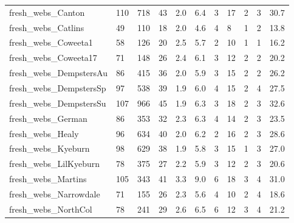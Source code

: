 \begin{longtable}{lllllllllll}
 fresh\_webs\_Canton                                  & 110        & 718       & 43    & 2.0    & 6.4    & 3     & 17     & 2      & 3      & 30.7    \\
 fresh\_webs\_Catlins                                 & 49         & 110       & 18    & 2.0    & 4.6    & 4     & 8      & 1      & 2      & 13.8    \\
 fresh\_webs\_Coweeta1                                & 58         & 126       & 20    & 2.5    & 5.7    & 2     & 10     & 1      & 1      & 16.2    \\
 fresh\_webs\_Coweeta17                               & 71         & 148       & 26    & 2.4    & 6.1    & 3     & 12     & 2      & 2      & 20.2    \\
 fresh\_webs\_DempstersAu                             & 86         & 415       & 36    & 2.0    & 5.9    & 3     & 15     & 2      & 2      & 26.2    \\
 fresh\_webs\_DempstersSp                             & 97         & 538       & 39    & 1.9    & 6.0    & 4     & 15     & 2      & 4      & 27.5    \\
 fresh\_webs\_DempstersSu                             & 107        & 966       & 45    & 1.9    & 6.3    & 3     & 18     & 2      & 3      & 32.6    \\
 fresh\_webs\_German                                  & 86         & 353       & 32    & 2.3    & 6.3    & 4     & 14     & 2      & 3      & 23.5    \\
 fresh\_webs\_Healy                                   & 96         & 634       & 40    & 2.0    & 6.2    & 2     & 16     & 2      & 3      & 28.6    \\
 fresh\_webs\_Kyeburn                                 & 98         & 629       & 38    & 1.9    & 5.8    & 3     & 15     & 1      & 3      & 27.0    \\
 fresh\_webs\_LilKyeburn                              & 78         & 375       & 27    & 2.2    & 5.9    & 3     & 12     & 2      & 3      & 20.6    \\
 fresh\_webs\_Martins                                 & 105        & 343       & 41    & 3.3    & 9.0    & 6     & 18     & 3      & 4      & 31.0    \\
 fresh\_webs\_Narrowdale                              & 71         & 155       & 26    & 2.3    & 5.6    & 4     & 10     & 2      & 4      & 18.6    \\
 fresh\_webs\_NorthCol                                & 78         & 241       & 29    & 2.6    & 6.5    & 6     & 12     & 3      & 4      & 21.2    \\

\end{longtable}

